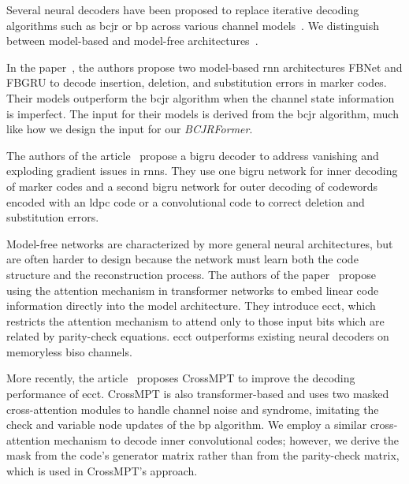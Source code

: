 \documentclass[conference,letterpaperu]{IEEEtran}
\begin{document}
Several neural decoders have been proposed to replace iterative decoding algorithms\,\textemdash\,such as \ac{bcjr} or \ac{bp}\,\textemdash\,across various channel models~\cite{nachmaniLearningDecodeLinear2016a, nachmaniDeepLearningMethods2018, sazliNeuralNetworkImplementation2007,shlezingerDatadrivenFactorGraphs2020b, farsadDatadrivenSymbolDetection2021, shlezingerViterbiNetSymbolDetection2019}. We distinguish between model-based and model-free architectures~\cite{shlezingerModelbasedDeepLearning2023}.

In the paper~\cite{maDeepLearningBasedDetection2024b}, the authors propose two model-based \ac{rnn} architectures\,\textemdash\,FBNet and FBGRU\,\textemdash\,to decode insertion, deletion, and substitution errors in marker codes. Their models outperform the \ac{bcjr} algorithm when the channel state information is imperfect. The input for their models is derived from the \ac{bcjr} algorithm, much like how we design the input for our \textit{BCJRFormer}.

The authors of the article~\cite{kargiDeepLearningBased2024b} propose a \ac{bigru} decoder to address vanishing and exploding gradient issues in \acp{rnn}. They use one \ac{bigru} network for inner decoding of marker codes and a second \ac{bigru} network for outer decoding of codewords encoded with an \ac{ldpc} code or a convolutional code to correct deletion and substitution errors. 

Model-free networks are characterized by more general neural architectures, but are often harder to design because the network must learn both the code structure and the reconstruction process. The authors of the paper~\cite{choukrounErrorCorrectionCode2022b} propose using the attention mechanism in transformer networks to embed linear code information directly into the model architecture. They introduce \ac{ecct}, which restricts the attention mechanism to attend only to those input bits which are related by parity-check equations. \ac{ecct} outperforms existing neural decoders on memoryless \ac{biso} channels. 

More recently, the article~\cite{park2025crossmpt} proposes CrossMPT to improve the decoding performance of \ac{ecct}. CrossMPT is also transformer-based and uses two masked cross-attention modules to handle channel noise and syndrome, imitating the check and variable node updates of the \ac{bp} algorithm. We employ a similar cross-attention mechanism to decode inner convolutional codes; however, we derive the mask from the code's generator matrix rather than from the parity-check matrix, which is used in CrossMPT's approach. 
\end{document}
